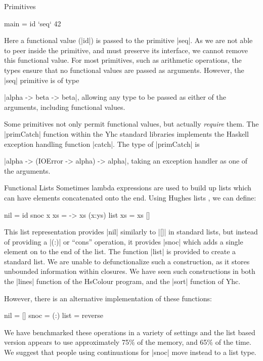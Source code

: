 \documentclass[preprint]{sigplanconf}
\begin{document}
\begin{examplename}{Primitives}
\begin{code}
main = id `seq` 42
\end{code}

Here a functional value (|id|) is passed to the primitive |seq|. As we are not able to peer inside the primitive, and must preserve its interface, we cannot remove this functional value. For most primitives, such as arithmetic operations, the types ensure that no functional values are passed as arguments. However, the |seq| primitive is of type \ignore|alpha -> beta -> beta|, allowing any type to be passed as either of the arguments, including functional values.

Some primitives not only permit functional values, but actually \textit{require} them. The |primCatch| function within the Yhc standard libraries implements the Haskell exception handling function |catch|. The type of |primCatch| is \ignore|alpha -> (IOError -> alpha) -> alpha|, taking an exception handler as one of the arguments.
\end{examplename}

\begin{examplename}{Functional Lists}
\label{ex:functional_lists}
Sometimes lambda expressions are used to build up lists which can have elements concatenated onto the end. Using Hughes lists \cite{hughes:lists}, we can define:

\begin{code}
nil = id
snoc x xs = \ys -> xs (x:ys)
list xs = xs []
\end{code}

This list representation provides |nil| similarly to |[]| in standard lists, but instead of providing a |(:)| or ``cons'' operation, it provides |snoc| which adds a single element on to the end of the list. The function |list| is provided to create a standard list. We are unable to defunctionalize such a construction, as it stores unbounded information within closures. We have seen such constructions in both the |lines| function of the HsColour program, and the |sort| function of Yhc.

However, there is an alternative implementation of these functions:

\begin{code}
nil = []
snoc = (:)
list = reverse
\end{code}

We have benchmarked these operations in a variety of settings and the list based version appears to use approximately 75\% of the memory, and 65\% of the time. We suggest that people using continuations for |snoc| move instead to a list type.
\end{examplename}
\end{document}

